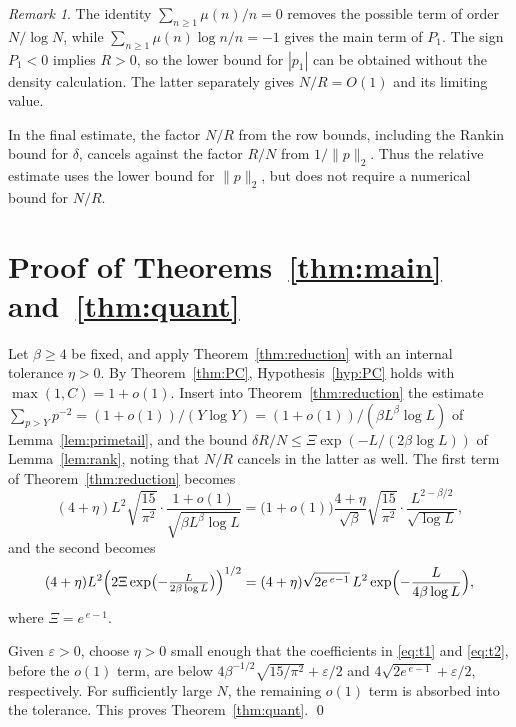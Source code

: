 \documentclass[11pt,a4paper]{article}
\theoremstyle{plain}
\theoremstyle{definition}
\theoremstyle{remark}
\newtheorem{remark}[theorem]{Remark}
\newcommand{\eps}{\varepsilon}
\begin{document}
\begin{remark}\label{rem:density}
The identity $\sum_{n\ge1}\mu(n)/n=0$ removes the possible term of order $N/\log N$,
while $\sum_{n\ge1}\mu(n)\log n/n=-1$ gives the main term of $P_1$.
The sign $P_1<0$ implies $R>0$, so the lower bound for $|p_1|$ can be obtained without the density
calculation. The latter separately gives $N/R=O(1)$ and its limiting value.

In the final estimate, the factor $N/R$ from the row bounds, including the Rankin bound for $\delta$,
cancels against the factor $R/N$ from $1/\|p\|_2$. Thus the relative estimate uses the lower bound
for $\|p\|_2$, but does not require a numerical bound for $N/R$.
\end{remark}

\section{Proof of Theorems~\ref{thm:main} and~\ref{thm:quant}}\label{sec:assembly}

Let $\beta\ge4$ be fixed, and apply Theorem~\ref{thm:reduction}
with an internal tolerance $\eta>0$. By Theorem~\ref{thm:PC}, Hypothesis~\ref{hyp:PC} holds with
$\max(1,C)=1+o(1)$. Insert into Theorem~\ref{thm:reduction} the estimate
$\sum_{p>Y}p^{-2}=(1+o(1))/(Y\log Y)=(1+o(1))/(\beta L^{\beta}\log L)$ of Lemma~\ref{lem:primetail}, and the
bound $\delta R/N\le\Xi\exp(-L/(2\beta\log L))$ of Lemma~\ref{lem:rank}, noting that $N/R$ cancels in the
latter as well. The first term of Theorem~\ref{thm:reduction} becomes
\begin{equation}\label{eq:t1}
  (4+\eta)L^{2}\sqrt{\frac{15}{\pi^{2}}}\cdot\frac{1+o(1)}{\sqrt{\beta L^{\beta}\log L}}
  =\bigl(1+o(1)\bigr)\frac{4+\eta}{\sqrt\beta}\sqrt{\frac{15}{\pi^{2}}}\cdot
   \frac{L^{2-\beta/2}}{\sqrt{\log L}},
\end{equation}
and the second becomes
\begin{equation}\label{eq:t2}
  (4+\eta)L^{2}\Bigl(2\Xi\exp\bigl(-\tfrac L{2\beta\log L}\bigr)\Bigr)^{1/2}
  =(4+\eta)\sqrt{2e^{\,e-1}}\,L^{2}\exp\Bigl(-\frac L{4\beta\log L}\Bigr),
\end{equation}
where $\Xi=e^{\,e-1}$.

Given $\eps>0$, choose $\eta>0$ small enough that the coefficients in
\eqref{eq:t1} and \eqref{eq:t2}, before the $o(1)$ term, are below
$4\beta^{-1/2}\sqrt{15/\pi^2}+\eps/2$ and $4\sqrt{2e^{\,e-1}}+\eps/2$, respectively.
For sufficiently large $N$, the remaining $o(1)$ term is absorbed into the tolerance.
This proves Theorem~\ref{thm:quant}. \qed
\end{document}
